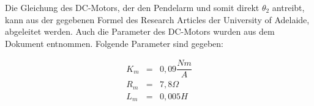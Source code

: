 Die Gleichung des DC-Motors, der den Pendelarm und somit direkt $\theta_2$ antreibt, kann aus der gegebenen Formel des Research Articles der University of Adelaide, abgeleitet werden.\cite{Cazzolato.2011}
Auch die Parameter des DC-Motors wurden aus dem Dokument entnommen. Folgende Parameter sind gegeben:

\begin{eqnarray}
K_m &=& 0,09  \dfrac{Nm}{A} \\
R_m &=& 7,8  \Omega \\
L_m &=& 0,005  H \\
\end{eqnarray}